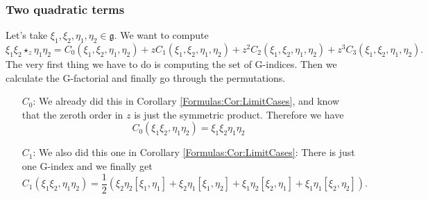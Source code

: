 \subsubsection*{Two quadratic terms}
Let's take $\xi_1, \xi_2, \eta_1, \eta_2 \in \mathfrak{g}$. We want to 
compute
\begin{equation*}
	\xi_1 \xi_2 \star_z \eta_1 \eta_2
	=
	C_0(\xi_1, \xi_2, \eta_1, \eta_2) 
	+ 
	z C_1(\xi_1, \xi_2, \eta_1, \eta_2) 
	+ 
	z^2 C_2(\xi_1, \xi_2, \eta_1, \eta_2) 
	+ 
	z^3 C_3(\xi_1, \xi_2, \eta_1, \eta_2).
\end{equation*}
The very first thing we have to do is computing the set of G-indices. Then we 
calculate the G-factorial and finally go through the permutations.
\begin{itemize}
	\item[$C_0$:]
	We already did this in Corollary \ref{Formulas:Cor:LimitCases}, and know 
	that the zeroth order in $z$ is just the symmetric product. Therefore we 
	have
	\begin{equation*}
		C_0(\xi_1 \xi_2, \eta_1 \eta_2)
		=
		\xi_1 \xi_2 \eta_1 \eta_2
	\end{equation*}
	
	\item[$C_1$:]
	We also did this one in Corollary \ref{Formulas:Cor:LimitCases}: There is 
	just one G-index and we finally get
	\begin{equation*}
		C_1(\xi_1 \xi_2, \eta_1 \eta_2)
		=
		\frac{1}{2} \left(
			\xi_2 \eta_2 [\xi_1, \eta_1] +
			\xi_2 \eta_1 [\xi_1, \eta_2] +
			\xi_1 \eta_2 [\xi_2, \eta_1] +
			\xi_1 \eta_1 [\xi_2, \eta_2]
		\right).
	\end{equation*}
	

\end{itemize}

